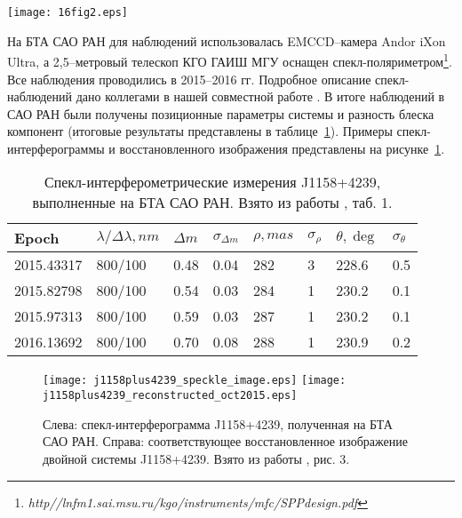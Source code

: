 \begin{figure*}
\centering
\texttt{[image: 16fig2.eps]}
\caption{Движение фотоцентра системы J1158+4239 по данным фотографических и цифровых обзоров неба (1955 "--- POSS1, 1984 "--- GSC1, 1990 и 1991 "--- POSS2, 1996 "--- GSC2, 2003 "--- SDSS, 2012 "--- пулковские наблюдения). Линия характеризует среднее движение фотоцентра.  Взято из работы \cite{2016AstL...42..686K}, рис. 2.}
\label{fig:J1158+4258_motion}
\end{figure*}
На БТА САО РАН для наблюдений использовалась  EMCCD--камера Andor iXon Ultra, а 2,5--метровый телескоп КГО ГАИШ МГУ оснащен спекл-поляриметром\footnote{\textit{http//lnfm1.sai.msu.ru/kgo/instruments/mfc/SPPdesign.pdf}}. Все наблюдения проводились в 2015--2016 гг.  Подробное описание спекл-наблюдений дано коллегами в нашей совместной работе \cite{2016AstL...42..686K}. В итоге наблюдений в САО РАН были получены позиционные параметры системы и разность блеска компонент (итоговые результаты представлены в таблице~\ref{tab:SI_meas}).  Примеры спекл-интерферограммы и восстановленного изображения представлены на рисунке~\ref{fig:sao_spekle_image}.

\begin{table}[p]
\centering
\caption{Спекл-интерферометрические измерения J1158+4239, выполненные на БТА САО РАН. Взято из работы \cite{2016AstL...42..686K}, таб. 1.}
\label{tab:SI_meas}
\bigskip
\begin{tabularx}{\textwidth}{l|l|ll|ll|ll}
Epoch      & $\lambda /\Delta \lambda, nm$ & $\Delta m$ & $\sigma _{\Delta m}$ & $\rho, mas$ & $\sigma _\rho$ & $\theta, \deg $& $\sigma_\theta$ \\
\hline
2015.43317 & 800/100 & 0.48 & 0.04 & 282 & 3  & 228.6 & 0.5               \\
2015.82798 & 800/100 & 0.54 & 0.03 & 284 & 1  & 230.2 & 0.1               \\
2015.97313 & 800/100 & 0.59 & 0.03 & 287 & 1  & 230.2 & 0.1               \\
2016.13692 & 800/100 & 0.70 & 0.08 & 288 & 1  & 230.9 & 0.2               \\
\hline
\end{tabularx}
\end{table}

\begin{figure}
\centering
\texttt{[image: j1158plus4239\_speckle\_image.eps]}
\texttt{[image: j1158plus4239\_reconstructed\_oct2015.eps]}
\caption{Слева: спекл-интерферограмма J1158+4239, полученная на БТА САО РАН. Справа: соответствующее восстановленное изображение двойной системы J1158+4239. Взято из работы \cite{2016AstL...42..686K}, рис. 3.}
\label{fig:sao_spekle_image}
\end{figure}

